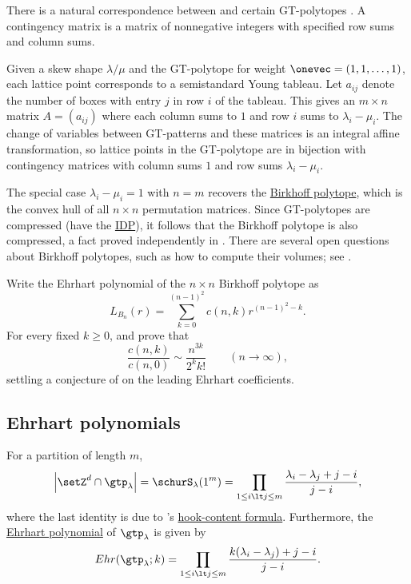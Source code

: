 There is a natural correspondence between
\label{contingencyMatrices} and certain
GT-polytopes \cite{Alexandersson2016GTPoly}.
A contingency matrix is a matrix of nonnegative integers with specified row
sums and column sums.

Given a skew shape $\lambda/\mu$ and the GT-polytope for weight
$\onevec = (1,1,\dotsc,1)$, each lattice point corresponds to a
semistandard Young tableau.
Let $a_{ij}$ denote the number of boxes with entry $j$ in row $i$ of the tableau.
This gives an $m \times n$ matrix $A = (a_{ij})$ where each column sums to $1$
and row $i$ sums to $\lambda_i - \mu_i$.
The change of variables between GT-patterns and these matrices is an integral
affine transformation, so lattice points in the GT-polytope are in bijection
with contingency matrices with column sums $1$ and row sums
$\lambda_i - \mu_i$.

The special case $\lambda_i - \mu_i = 1$ with $n = m$ recovers the
\hyperref[birkhoffPolytopeDefinition]{Birkhoff polytope}, which is the convex hull of
all $n \times n$ permutation matrices.
Since GT-polytopes are compressed (have the \hyperref[polytopeIDP]{IDP}),
it follows that the Birkhoff polytope is also compressed,
a fact proved independently in \cite{StanleyDecompositions80}.
There are several open questions about Birkhoff polytopes,
such as how to compute their volumes; see \cite{Pak2000}.

Write the Ehrhart polynomial of the $n\times n$ Birkhoff polytope as
\[
L_{B_n}(r)=\sum_{k=0}^{(n-1)^2}c(n,k)r^{(n-1)^2-k}.
\]
For every fixed $k\geq0$,  and  prove
\cite[Thm.~1.1]{LiuTang2026Birkhoff} that
\[
\frac{c(n,k)}{c(n,0)}
\sim \frac{n^{3k}}{2^k k!}
\qquad(n\to\infty),
\]
settling a conjecture of  on the leading Ehrhart
coefficients.




\subsection[gtEhrhart]{Ehrhart polynomials}

For a partition of length $m$,
\[
 \left| \setZ^d \cap \gtp_{\lambda} \right| = \schurS_{\lambda}(1^m)  =
 \prod_{1 \leq i \lt j \leq m } \frac{\lambda_i - \lambda_j + j-i}{j-i},
\]
where the last identity is due to 's
\hyperref[schurSpecializations]{hook-content formula}.
Furthermore, the \hyperref[ehrhart]{Ehrhart polynomial} of $\gtp_{\lambda}$ is
given by
\[
Ehr(\gtp_{\lambda};k) = \prod_{1 \leq i \lt j \leq m } \frac{k(\lambda_i - \lambda_j) + j-i}{j-i}.
\]


